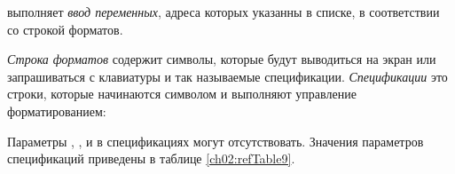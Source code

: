 
выполняет \emph{ввод переменных}, адреса которых указанны в списке, в
соответствии со строкой форматов. 

\emph{Строка форматов} содержит символы, которые будут выводиться на экран или запрашиваться с клавиатуры и
так называемые спецификации. \emph{Спецификации} это строки, которые начинаются символом
\Sys{\%} и выполняют управление форматированием:


Параметры , ,  и
 в спецификациях могут отсутствовать. Значения параметров спецификаций приведены в
таблице \ref{ch02:refTable9}.


